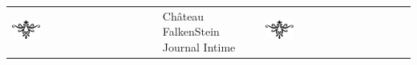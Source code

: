 \documentclass[a5paper,french]{article}
\begin{document}




\begin{center}
	\begin{tabular}[c]{ p{} p{} p{} }
		\includegraphics[width=0.20\textwidth]{../../images/artsdecos/ornement01whiteBG.png} & 
			\centering
			{ \Huge{\setmainfont{Chomsky} Château FalkenStein } }~\newline~\newline~\newline
			{ \LARGE{ \setmainfont{Z003} Journal Intime } }
		& \includegraphics[width=0.20\textwidth]{../../images/artsdecos/ornement01whiteBG.png} \\
	\end{tabular}
\end{center}
\end{document}
